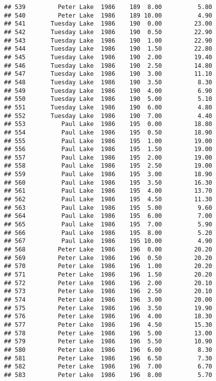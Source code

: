 \documentclass[
]{article}
\begin{document}
\begin{verbatim}
## 539         Peter Lake  1986    189  8.00          5.80
## 540         Peter Lake  1986    189 10.00          4.90
## 541       Tuesday Lake  1986    190  0.00         23.00
## 542       Tuesday Lake  1986    190  0.50         22.90
## 543       Tuesday Lake  1986    190  1.00         22.90
## 544       Tuesday Lake  1986    190  1.50         22.80
## 545       Tuesday Lake  1986    190  2.00         19.40
## 546       Tuesday Lake  1986    190  2.50         14.80
## 547       Tuesday Lake  1986    190  3.00         11.10
## 548       Tuesday Lake  1986    190  3.50          8.30
## 549       Tuesday Lake  1986    190  4.00          6.90
## 550       Tuesday Lake  1986    190  5.00          5.10
## 551       Tuesday Lake  1986    190  6.00          4.80
## 552       Tuesday Lake  1986    190  7.00          4.40
## 553          Paul Lake  1986    195  0.00         18.80
## 554          Paul Lake  1986    195  0.50         18.90
## 555          Paul Lake  1986    195  1.00         19.00
## 556          Paul Lake  1986    195  1.50         19.00
## 557          Paul Lake  1986    195  2.00         19.00
## 558          Paul Lake  1986    195  2.50         19.00
## 559          Paul Lake  1986    195  3.00         18.90
## 560          Paul Lake  1986    195  3.50         16.30
## 561          Paul Lake  1986    195  4.00         13.70
## 562          Paul Lake  1986    195  4.50         11.30
## 563          Paul Lake  1986    195  5.00          9.60
## 564          Paul Lake  1986    195  6.00          7.00
## 565          Paul Lake  1986    195  7.00          5.90
## 566          Paul Lake  1986    195  8.00          5.20
## 567          Paul Lake  1986    195 10.00          4.90
## 568         Peter Lake  1986    196  0.00         20.20
## 569         Peter Lake  1986    196  0.50         20.20
## 570         Peter Lake  1986    196  1.00         20.20
## 571         Peter Lake  1986    196  1.50         20.20
## 572         Peter Lake  1986    196  2.00         20.10
## 573         Peter Lake  1986    196  2.50         20.10
## 574         Peter Lake  1986    196  3.00         20.00
## 575         Peter Lake  1986    196  3.50         19.90
## 576         Peter Lake  1986    196  4.00         18.30
## 577         Peter Lake  1986    196  4.50         15.30
## 578         Peter Lake  1986    196  5.00         13.00
## 579         Peter Lake  1986    196  5.50         10.90
## 580         Peter Lake  1986    196  6.00          8.30
## 581         Peter Lake  1986    196  6.50          7.30
## 582         Peter Lake  1986    196  7.00          6.70
## 583         Peter Lake  1986    196  8.00          5.70

\end{verbatim}
\end{document}
